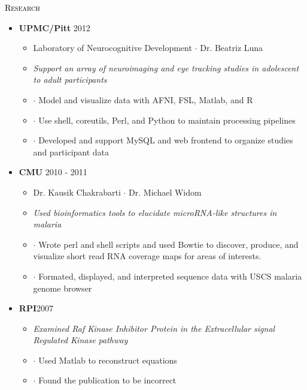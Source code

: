 \begin{minipage}{\firstWidth}
\large \textcolor{Black}{\textsc{Research}}
\end{minipage}
\begin{minipage}{\secondWidth}
\begin{itemize}
\item{\textbf{UPMC/Pitt} \hfill 2012}
	\begin{itemize}
	\item{Laboratory of Neurocognitive Development $\cdot$ Dr. Beatriz Luna}
	\item {\em Support an array of neuroimaging and eye tracking studies in adolescent to adult participants }
	\item $\cdot$ Model and visualize data with AFNI, FSL, Matlab, and R 
	\item $\cdot$ Use shell, coreutils, Perl, and Python to maintain processing pipelines
	\item $\cdot$ Developed and support MySQL and web frontend to organize studies and participant data
	\end{itemize}
\item{\textbf{CMU} \hfill 2010 - 2011} 
	\begin{itemize}
	\item{Dr. Kausik Chakrabarti $\cdot$ Dr. Michael Widom}
	\item {\em Used bioinformatics tools to elucidate microRNA-like structures in malaria}
	\item $\cdot$ Wrote perl and shell scripts and used Bowtie to discover, produce, and visualize short read RNA coverage maps for areas of interests.  
	\item $\cdot$ Formated, displayed, and interpreted sequence data with USCS malaria genome browser
	\end{itemize}
\item{\textbf{RPI}\hfill 2007}
	\begin{itemize}
	\item{\em Examined Raf Kinase Inhibitor Protein in the Extracellular signal Regulated Kinase pathway}
	\item $\cdot$ Used Matlab to reconstruct equations
	\item $\cdot$ Found the publication to be incorrect
	\end{itemize}
\end{itemize}
\end{minipage}
